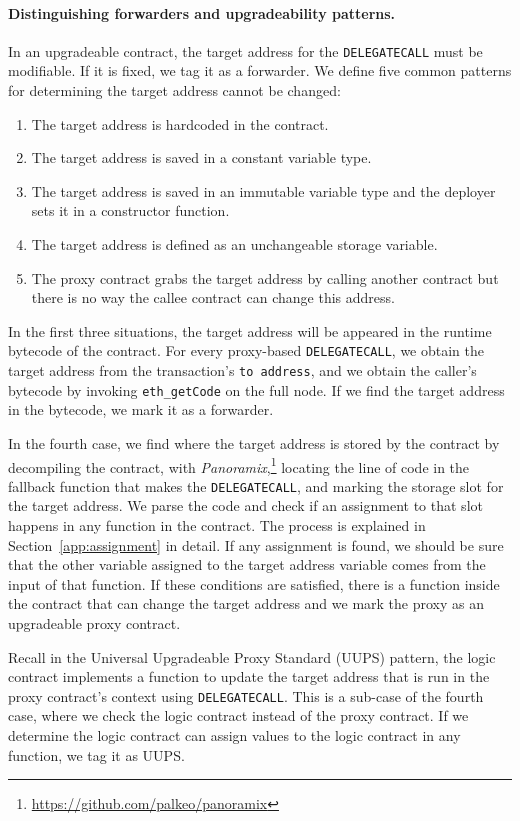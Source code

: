 \paragraph{Distinguishing forwarders and upgradeability patterns.} In an upgradeable contract, the target address for the \texttt{DELEGATECALL} must be modifiable. If it is fixed, we tag it as a forwarder. We define five common patterns for determining the target address cannot be changed:

\begin{enumerate}
 \item The target address is hardcoded in the contract.
 \item The target address is saved in a constant variable type.
 \item The target address is saved in an immutable variable type and the deployer sets it in a constructor function.
 \item The target address is defined as an unchangeable storage variable.
 \item The proxy contract grabs the target address by calling another contract but there is no way the callee contract can change this address.
\end{enumerate}

In the first three situations, the target address will be appeared in the runtime bytecode of the contract. For every proxy-based \texttt{DELEGATECALL}, we obtain the target address from the transaction's \texttt{to address}, and we obtain the caller's bytecode by invoking \texttt{eth\_getCode} on the full node. If we find the target address in the bytecode, we mark it as a forwarder. 

In the fourth case, we find where the target address is stored by the contract by decompiling the contract, with \textit{Panoramix},\footnote{\url{https://github.com/palkeo/panoramix}} locating the line of code in the fallback function that makes the \texttt{DELEGATECALL}, and marking the storage slot for the target address. We parse the code and check if an assignment to that slot happens in any function in the contract. The process is explained in Section~\ref{app:assignment} in detail. If any assignment is found, we should be sure that the other variable assigned to the target address variable comes from the input of that function. If these conditions are satisfied, there is a function inside the contract that can change the target address and we mark the proxy as an upgradeable proxy contract. 

Recall in the Universal Upgradeable Proxy Standard (UUPS) pattern, the logic contract implements a function to update the target address that is run in the proxy contract's context using \texttt{DELEGATECALL}. This is a sub-case of the fourth case, where we check the logic contract instead of the proxy contract. If we determine the logic contract can assign values to the logic contract in any function, we tag it as UUPS.

